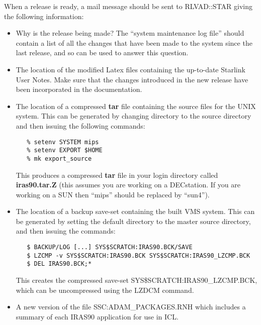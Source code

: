 When a release is ready, a mail message should be sent to RLVAD::STAR giving the
following information:

\begin{itemize}
\item Why is the release being made? The ``system maintenance log file'' should
contain a list of all the changes that have been made to the system since the
last release, and so can be used to answer this question.
\item The location of the modified Latex files containing the up-to-date
Starlink User Notes. Make sure that the changes introduced in the new release
have been incorporated in the documentation.
\item The location of a compressed {\bf tar} file containing the source files
for the {\small UNIX} system. This can be generated by changing directory to the
source directory and then issuing the following commands:

\small
\begin{verbatim}
   % setenv SYSTEM mips
   % setenv EXPORT $HOME
   % mk export_source
\end{verbatim}
\normalsize

This produces a compressed {\bf tar} file in your login directory called
{\bf iras90.tar.Z} (this assumes you are working on a DECstation. If you are
working on a {\small SUN} then ``mips'' should be replaced by ``sun4'').
\item The location of a backup save-set containing the built {\small VMS}
system. This can be generated by setting the default directory to the master
source directory, and then issuing the commands:

\small
\begin{verbatim}
   $ BACKUP/LOG [...] SYS$SCRATCH:IRAS90.BCK/SAVE
   $ LZCMP -v SYS$SCRATCH:IRAS90.BCK SYS$SCRATCH:IRAS90_LZCMP.BCK
   $ DEL IRAS90.BCK;*
\end{verbatim}

This creates the compressed save-set {\small SYS\$SCRATCH:IRAS90\_LZCMP.BCK},
which can be uncompressed using the {\small LZDCM} command.
\item A new version of the file {\small SSC:ADAM\_PACKAGES.RNH} which includes a
summary of each {\small IRAS90} application for use in {\small ICL}.
\end{itemize}



